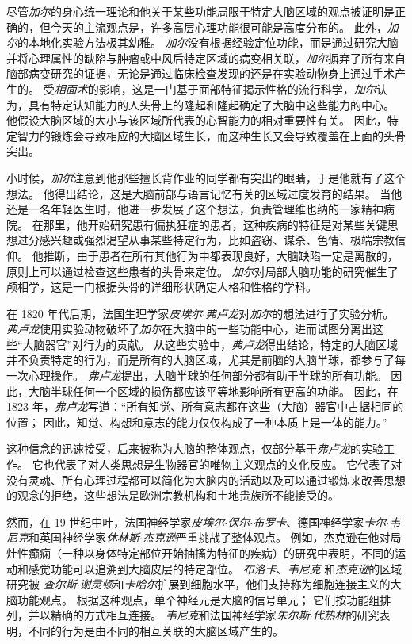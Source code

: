 尽管\textit{加尔}的身心统一理论和他关于某些功能局限于特定大脑区域的观点被证明是正确的，但今天的主流观点是，许多高层心理功能很可能是高度分布的。
此外，\textit{加尔}的本地化实验方法极其幼稚。
\textit{加尔}没有根据经验定位功能，而是通过研究大脑并将心理属性的缺陷与肿瘤或中风后特定区域的病变相关联，\textit{加尔}摒弃了所有来自脑部病变研究的证据，无论是通过临床检查发现的还是在实验动物身上通过手术产生的。
受\textit{相面术}的影响，这是一门基于面部特征揭示性格的流行科学，\textit{加尔}认为，具有特定认知能力的人头骨上的隆起和隆起确定了大脑中这些能力的中心。
他假设大脑区域的大小与该区域所代表的心智能力的相对重要性有关。
因此，特定智力的锻炼会导致相应的大脑区域生长，而这种生长又会导致覆盖在上面的头骨突出。


小时候，\textit{加尔}注意到他那些擅长背作业的同学都有突出的眼睛，于是他就有了这个想法。
他得出结论，这是大脑前部与语言记忆有关的区域过度发育的结果。
当他还是一名年轻医生时，他进一步发展了这个想法，负责管理维也纳的一家精神病院。
在那里，他开始研究患有偏执狂症的患者，这种疾病的特征是对某些关键思想过分感兴趣或强烈渴望从事某些特定行为，比如盗窃、谋杀、色情、极端宗教信仰。
他推断，由于患者在所有其他行为中都表现良好，大脑缺陷一定是离散的，原则上可以通过检查这些患者的头骨来定位。
\textit{加尔}对局部大脑功能的研究催生了颅相学，这是一门根据头骨的详细形状确定人格和性格的学科。


在 1820 年代后期，法国生理学家\textit{皮埃尔$\cdot$弗卢龙}对\textit{加尔}的想法进行了实验分析。 
\textit{弗卢龙}使用实验动物破坏了\textit{加尔}在大脑中的一些功能中心，进而试图分离出这些“大脑器官”对行为的贡献。
从这些实验中，\textit{弗卢龙}得出结论，特定的大脑区域并不负责特定的行为，而是所有的大脑区域，尤其是前脑的大脑半球，都参与了每一次心理操作。
\textit{弗卢龙}提出，大脑半球的任何部分都有助于半球的所有功能。
因此，大脑半球任何一个区域的损伤都应该平等地影响所有更高的功能。
因此，在 1823 年，\textit{弗卢龙}写道：“所有知觉、所有意志都在这些（大脑）器官中占据相同的位置；
因此，知觉、构想和意志的能力仅仅构成了一种本质上是一体的能力。”


这种信念的迅速接受，后来被称为大脑的整体观点，仅部分基于\textit{弗卢龙}的实验工作。
它也代表了对人类思想是生物器官的唯物主义观点的文化反应。
它代表了对没有灵魂、所有心理过程都可以简化为大脑内的活动以及可以通过锻炼来改善思想的观念的拒绝，这些想法是欧洲宗教机构和土地贵族所不能接受的。


然而，在 19 世纪中叶，法国神经学家\textit{皮埃尔$\cdot$保尔$\cdot$布罗卡}、德国神经学家\textit{卡尔$\cdot$韦尼克}和英国神经学家\textit{休林斯$\cdot$杰克逊}严重挑战了整体观点。
例如，杰克逊在他对局灶性癫痫（一种以身体特定部位开始抽搐为特征的疾病）的研究中表明，不同的运动和感觉功能可以追溯到大脑皮层的特定部位。
\textit{布洛卡}、\textit{韦尼克} 和\textit{杰克逊}的区域研究被 \textit{查尔斯$\cdot$谢灵顿}和\textit{卡哈尔}扩展到细胞水平，他们支持称为细胞连接主义的大脑功能观点。
根据这种观点，单个神经元是大脑的信号单元；
它们按功能组排列，并以精确的方式相互连接。
\textit{韦尼克}和法国神经学家\textit{朱尔斯$\cdot$代热林}的研究表明，不同的行为是由不同的相互关联的大脑区域产生的。


